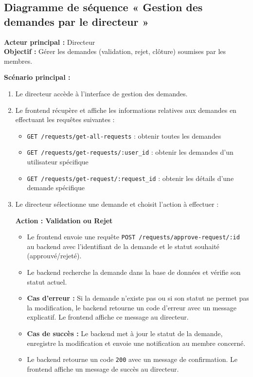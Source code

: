 \subsection{Diagramme de séquence « Gestion des demandes par le directeur »}

\textbf{Acteur principal :} Directeur \\
\textbf{Objectif :} Gérer les demandes (validation, rejet, clôture) soumises par les membres.

\textbf{Scénario principal :}
\begin{enumerate}
  \item Le directeur accède à l'interface de gestion des demandes.
  \item Le frontend récupère et affiche les informations relatives aux demandes en effectuant les requêtes suivantes :
  \begin{itemize}
      \item \texttt{GET /requests/get-all-requests} : obtenir toutes les demandes
      \item \texttt{GET /requests/get-requests/:user\_id} : obtenir les demandes d'un utilisateur spécifique
      \item \texttt{GET /requests/get-request/:request\_id} : obtenir les détails d'une demande spécifique
  \end{itemize}
  \item Le directeur sélectionne une demande et choisit l'action à effectuer :
  
  \textbf{Action : Validation ou Rejet}
  \begin{itemize}
      \item Le frontend envoie une requête \texttt{POST /requests/approve-request/:id} au backend avec l'identifiant de la demande et le statut souhaité (approuvé/rejeté).
      \item Le backend recherche la demande dans la base de données et vérifie son statut actuel.
      \item \textbf{Cas d'erreur :} Si la demande n'existe pas ou si son statut ne permet pas la modification, le backend retourne un code d'erreur avec un message explicatif. Le frontend affiche ce message au directeur.
      \item \textbf{Cas de succès :} Le backend met à jour le statut de la demande, enregistre la modification et envoie une notification au membre concerné.
      \item Le backend retourne un code \texttt{200} avec un message de confirmation. Le frontend affiche un message de succès au directeur.
  \end{itemize}


\end{enumerate}
